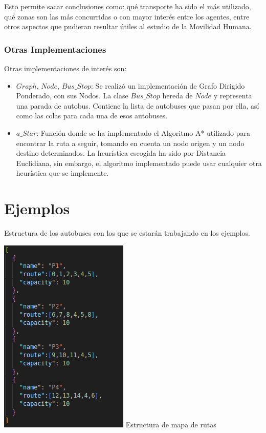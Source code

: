 \documentclass{article}
\begin{document}
Esto permite sacar conclusiones como: qué transporte ha sido el más utilizado, qué zonas son las más concurridas o con mayor interés entre los agentes, entre otros aspectos que pudieran resultar útiles al estudio de la Movilidad Humana.

\subsubsection{Otras Implementaciones}
Otras implementaciones de interés son:
\begin{itemize}
    \item $Graph$, $Node$, $Bus\_Stop$: Se realizó un implementación de Grafo Dirigido Ponderado, con sus Nodos. La clase $Bus\_Stop$ hereda de $Node$ y representa una parada de autobus. Contiene la lista de autobuses que pasan por ella, así como las colas para cada una de esos autobuses.
    \item $a\_Star$: Función donde se ha implementado el Algoritmo A* utilizado para encontrar la ruta a seguir, tomando en cuenta un nodo origen y un nodo destino determinados. La heurística escogida ha sido por Distancia Euclidiana, sin embargo, el algoritmo implementado puede usar cualquier otra heurística que se implemente.
\end{itemize}

\section{Ejemplos}

Estructura de los autobuses con los que se estarán trabajando en los ejemplos.

\includegraphics{buses.png}
\newpage
Estructura de mapa de rutas
\end{document}
